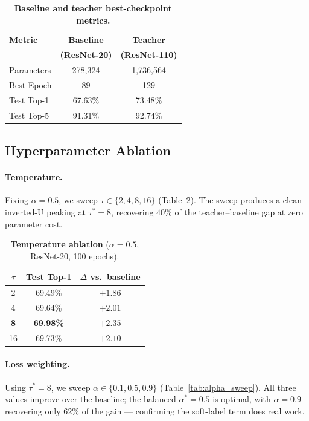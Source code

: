 \documentclass{article}
\theoremstyle{plain}
\theoremstyle{definition}
\theoremstyle{remark}
\begin{document}
\begin{table}[ht]
  \centering
  \caption{
    \textbf{Baseline and teacher best-checkpoint metrics.}}
  \label{tab:baseline}
  \begin{tabular}{lcc}
    \toprule
    \textbf{Metric} & \textbf{Baseline} & \textbf{Teacher} \\
                    & \textbf{(ResNet-20)} & \textbf{(ResNet-110)} \\
    \midrule
    Parameters          & 278{,}324    & 1{,}736{,}564 \\
    Best Epoch          & 89           & 129 \\
    Test Top-1          & 67.63\%      & 73.48\% \\
    Test Top-5          & 91.31\%      & 92.74\% \\
    \bottomrule
  \end{tabular}
\end{table}

\subsection{Hyperparameter Ablation}
\label{sec:results_hparam}

\paragraph{Temperature.} Fixing $\alpha = 0.5$, we sweep $\tau \in \{2, 4, 8, 16\}$ (Table~\ref{tab:tau_sweep}). The sweep produces a clean inverted-U peaking at $\tau^* = 8$, recovering $40\%$ of the teacher--baseline gap at zero parameter cost.

\begin{table}[ht]
  \centering
  \caption{\textbf{Temperature ablation} ($\alpha=0.5$, ResNet-20, 100 epochs).}
  \label{tab:tau_sweep}
  \begin{tabular}{ccc}
    \toprule
    $\tau$ & Test Top-1 & $\Delta$ vs.\ baseline \\
    \midrule
    2  & 69.49\% & $+1.86$ \\
    4  & 69.64\% & $+2.01$ \\
    \textbf{8}  & \textbf{69.98\%} & $\mathbf{+2.35}$ \\
    16 & 69.73\% & $+2.10$ \\
    \bottomrule
  \end{tabular}
\end{table}

\paragraph{Loss weighting.} Using $\tau^* = 8$, we sweep $\alpha \in \{0.1, 0.5, 0.9\}$ (Table~\ref{tab:alpha_sweep}). All three values improve over the baseline; the balanced $\alpha^* = 0.5$ is optimal, with $\alpha=0.9$ recovering only $62\%$ of the gain --- confirming the soft-label term does real work.
\end{document}
